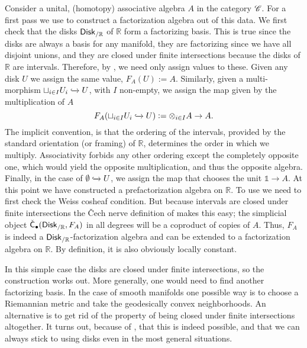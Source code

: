 \documentclass[../text.tex]{subfiles}
\begin{document}
\begin{construction}\label{con:lcfas_on_R}
    Consider a unital, (homotopy) associative algebra $A$ in the category $\mathscr{C}$. For a first pass we use \cite[\S7.2]{cg2016} to construct a factorization algebra out of this data. We first check that the disks $\disk[r]_{/\mathbb{R}}$ of $\mathbb{R}$ form a factorizing basis. This is true since the disks are always a basis for any manifold, they are factorizing since we have all disjoint unions, and they are closed under finite intersections because the disks of $\mathbb{R}$ are intervals. Therefore, by \cite[\S7.2]{cg2016}, we need only assign values to these. Given any disk $U$ we assign the same value, $F_A(U) := A$. Similarly, given a multi-morphism $\sqcup_{i \in I} U_i \xhookrightarrow{} U$, with $I$ non-empty, we assign the map given by the multiplication of $A$
    \begin{equation}
        F_A(\sqcup_{i \in I} U_i \xhookrightarrow{} U) := \otimes_{i \in I} A \rightarrow A.
    \end{equation}
    The implicit convention, is that the ordering of the intervals, provided by the standard orientation (or framing) of $\mathbb{R}$, determines the order in which we multiply. Associativity forbids any other ordering except the completely opposite one, which would yield the opposite multiplication, and thus the opposite algebra. Finally, in the case of $\emptyset \xhookrightarrow{} U$, we assign the map that chooses the unit $\mathbb{1} \rightarrow A$. At this point we have constructed a prefactorization algebra on $\mathbb{R}$. To use \cite[\S7.2]{cg2016} we need to first check the Weiss cosheaf condition. But because intervals are closed under finite intersections the \v{C}ech nerve definition of  makes this easy; the simplicial object $\cech_{\bullet}(\disk[r]_{/\mathbb{R}}, F_A)$ in all degrees will be a coproduct of copies of $A$. Thus, $F_A$ is indeed a $\disk[r]_{/\mathbb{R}}$-factorization algebra and can be extended to a factorization algebra on $\mathbb{R}$. By definition, it is also obviously locally constant.

    In this simple case the disks are closed under finite intersections, so the construction works out. More generally, one would need to find another factorizing basis. In the case of smooth manifolds one possible way is to choose a Riemannian metric and take the geodesically convex neighborhoods. An alternative is to get rid of the property of being closed under finite intersections altogether. It turns out, because of , that this is indeed possible, and that we can always stick to using disks even in the most general situations.


\end{construction}
\end{document}
